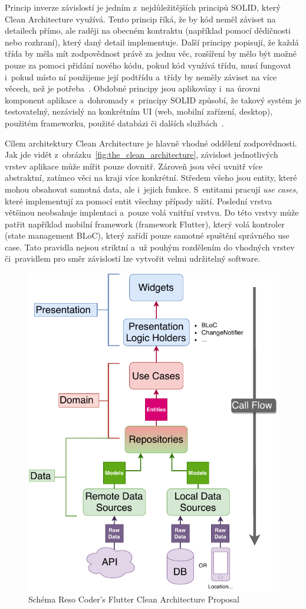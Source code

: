 Princip inverze závislostí je jedním z~nejdůležitějších principů SOLID,
který Clean Architecture využívá.
Tento princip říká,
že by kód neměl záviset na detailech přímo,
ale raději na obecném kontraktu
(například pomocí dědičnosti nebo rozhraní),
který daný detail implementuje.
Další principy popisují,
že každá třída by měla mít zodpovědnost právě za jednu
věc,
rozšíření by mělo být možné pouze za pomoci přidání nového kódu,
pokud kód využívá třídu,
musí fungovat i~pokud místo ní použijeme její podtřídu
a~třídy by neměly záviset na více věcech,
než je potřeba~\cite[str.~61--91]{martin_clean_architecture}.
Obdobné principy jsou aplikovány i~na úrovni komponent aplikace
a~dohromady s~principy SOLID způsobí,
že takový systém je testovatelný,
nezávislý na konkrétním UI (web, mobilní zařízení, desktop),
použitém frameworku, použité databázi či dalších
službách~\cite{the_clean_architecture}.

Cílem architektury Clean Architecture je hlavně vhodné oddělení zodpovědnosti.
Jak jde vidět z~obrázku~\ref{fig:the_clean_architecture},
závislost jednotlivých vrstev aplikace může mířit pouze dovnitř.
Zároveň jsou věci uvnitř více abstraktní,
zatímco věci na kraji více konkrétní.
Středem všeho jsou entity,
které mohou obsahovat samotná data,
ale i~jejich funkce.
S~entitami pracují \emph{use cases},
které implementují za pomocí entit všechny případy užití.
Poslední vrstva většinou neobsahuje implentaci
a~pouze volá vnitřní vrstvu.
Do této vrstvy může patřit například mobilní framework (framework Flutter),
který volá kontroler (state management BLoC),
který zařídí pouze samotné spuštění správného use case.
Tato pravidla nejsou striktní a~už pouhým rozdělením do vhodných vrstev
či~pravidlem pro směr závislostí lze vytvořit velmi udržitelný
software.~\cite{the_clean_architecture}

\begin{figure}[t!]
    \centering
    \includegraphics[width=0.7\linewidth]{assets/technology-research/architecture/reso-coder-clean-architecture.pdf}
    \caption{Schéma Reso Coder's Flutter Clean Architecture Proposal~\cite{the_clean_architecture}}
    \label{fig:reso_coder_clean_architecture}
\end{figure}

